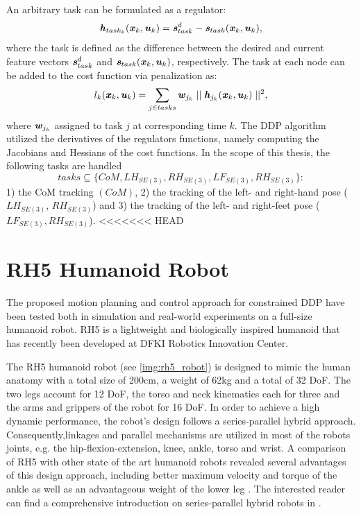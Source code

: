 An arbitrary task can be formulated as a regulator: 
\begin{equation*} 
\bm{\mathit{h}}_{task_k}(\bm{\mathit{x}}_k,\bm{\mathit{u}}_k)=\bm{\mathit{s}}_{task}^d-\bm{\mathit{s}}_{task}(\bm{\mathit{x}}_k,\bm{\mathit{u}}_k),
\end{equation*}   
where the task is defined as the difference between the desired and current feature vectors $\bm{\mathit{s}}_{task}^d$ and $\bm{\mathit{s}}_{task}(\bm{\mathit{x}}_k,\bm{\mathit{u}}_k)$, respectively. The task at each node can be added to the cost function via penalization as: 
\begin{equation*} 
l_k(\bm{\mathit{x}}_k,\bm{\mathit{u}}_k)=\sum_{j\in tasks}\bm{\mathit{w}}_{j_k}\mid\mid\bm{\mathit{h}}_{j_k}(\bm{\mathit{x}}_k,\bm{\mathit{u}}_k)\mid\mid^2,
\end{equation*}  
where $\bm{\mathit{w}}_{j_k}$ assigned to task $j$ at corresponding time $k$. The \gls{DDP} algorithm utilized the derivatives of the regulators functions, namely computing the Jacobians and Hessians of the cost functions. 
In the scope of this thesis, the following tasks are handled
\begin{equation}
tasks \subseteq \{CoM, LH_{SE(3)}, RH_{SE(3)}, LF_{SE(3)}, RH_{SE(3)}\}:
\end{equation}
1) the \gls{CoM} tracking $(CoM)$, 2) the tracking of the left- and right-hand pose ($LH_{SE(3)}$, $RH_{SE(3)}$) and 3) the tracking of the left- and right-feet pose ($LF_{SE(3)}, RH_{SE(3)}$).
<<<<<<< HEAD


\section{RH5 Humanoid Robot}
The proposed motion planning and control approach for constrained \gls{DDP} have been tested both in simulation and real-world experiments on a full-size humanoid robot. RH5 is a lightweight and biologically inspired humanoid that has recently been developed at DFKI Robotics Innovation Center\cite{peters2017konstruktion}.

The RH5 humanoid robot (see \cref{img:rh5_robot}) is designed to mimic the human anatomy with a total size of 200cm, a weight of 62kg and a total of 32 \gls{DoF}. The two legs account for 12 \gls{DoF}, the torso and neck kinematics each for three and the arms and grippers of the robot for 16 \gls{DoF}. In order to achieve a high dynamic performance, the robot's design follows a series-parallel hybrid approach. Consequently,linkages and parallel mechanisms are utilized in most of the robots joints, e.g. the hip-flexion-extension, knee, ankle, torso and wrist. A comparison of RH5 with other state of the art humanoid robots revealed several advantages of this design approach, including better maximum velocity and torque of the ankle as well as an advantageous weight of the lower leg \cite{kumar2020survey}. The interested reader can find a comprehensive introduction on series-parallel hybrid robots in \cite[Ch.2]{kumar2019modular}. 


